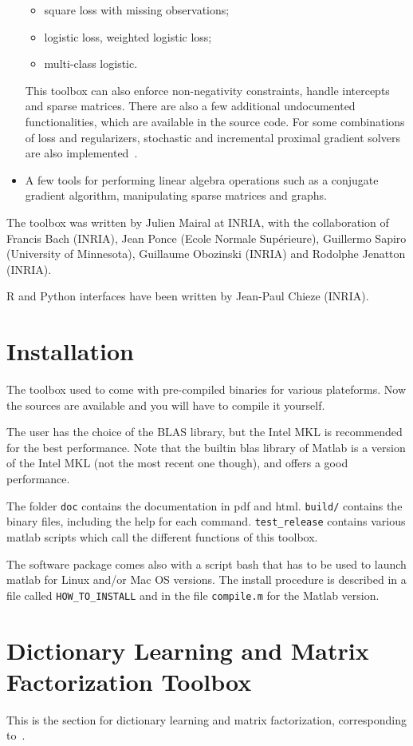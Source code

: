 \documentclass[a4paper, 11pt]{article}
\begin{document}
\begin{itemize}
\begin{itemize}
\item square loss with missing observations; 
\item logistic loss, weighted logistic loss;
\item multi-class logistic.
\end{itemize}
This toolbox can also enforce non-negativity constraints, handle intercepts and
sparse matrices.  There are also a few additional undocumented functionalities,
which are available in the source code.
For some combinations of loss and regularizers, stochastic and incremental proximal
gradient solvers are also implemented~\cite{mairal15,mairal16}.
\item A few tools for performing linear algebra operations such as a
conjugate gradient algorithm, manipulating sparse matrices and graphs.
\end{itemize}

The toolbox was written by Julien Mairal at INRIA, with the collaboration of
Francis Bach (INRIA), Jean Ponce (Ecole Normale Sup\'erieure), Guillermo Sapiro
(University of Minnesota), Guillaume Obozinski (INRIA) and Rodolphe Jenatton
(INRIA).

R and Python interfaces have been written by Jean-Paul Chieze (INRIA).

\section{Installation}
The toolbox used to come with pre-compiled binaries for various plateforms. 
Now the sources are available and you will have to compile it yourself.

The user has the choice of the BLAS library, but the Intel MKL is recommended
for the best performance. Note that the builtin blas library of Matlab is a
version of the Intel MKL (not the most recent one though), and offers 
a good performance.

The folder \verb|doc| contains the documentation in pdf and html. \verb|build/|
contains the binary files, including the help for each command.
\verb|test_release| contains various matlab scripts which call the different
functions of this toolbox.

The software package comes also with a script bash that has to be used to
launch matlab for Linux and/or Mac OS versions.  The install procedure is
described in a file called \verb|HOW_TO_INSTALL| and in the file
\verb|compile.m| for the Matlab version.

\section{Dictionary Learning and Matrix Factorization Toolbox}
This is the section for dictionary learning and matrix factorization, corresponding to~\cite{mairal7,mairal9}.
\end{document}
